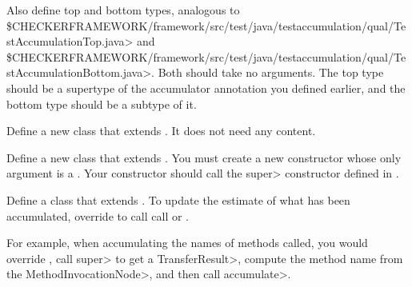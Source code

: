 Also define top and bottom types, analogous to
\<\$CHECKERFRAMEWORK/framework/src/test/java/testaccumulation/qual/TestAccumulationTop.java>
and
\<\$CHECKERFRAMEWORK/framework/src/test/java/testaccumulation/qual/TestAccumulationBottom.java>.
Both should take no arguments. The top type should be a supertype of the accumulator annotation
you defined earlier, and the bottom type should be a subtype of it.


Define a new class that extends .
It does not need any content.

Define a new class that extends .
You must create a new constructor whose only argument is a .
Your constructor should call the \<super> constructor defined in
.



Define a class that extends .
To update the estimate of what has been accumulated, override
 to call
call
or
.

For example, when accumulating the names of methods called, you would override
,
call \<super> to get a \<TransferResult>, compute the method name from the \<MethodInvocationNode>,
and then call \<accumulate>.
